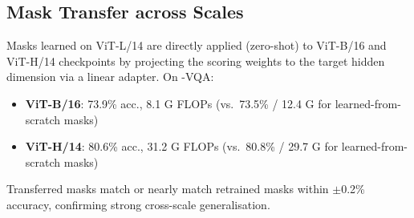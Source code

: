 \subsection{Mask Transfer across Scales}

\begin{tcolorbox}[contributionbox, title={Transfer Experiment}]
  \small
  Masks learned on ViT-L/14 are directly applied (zero-shot) to
  ViT-B/16 and ViT-H/14 checkpoints by projecting the scoring
  weights to the target hidden dimension via a linear adapter.
  On \dataset{}-VQA:
  \begin{itemize}[leftmargin=1em, itemsep=2pt, topsep=3pt]
    \item \textbf{ViT-B/16}: 73.9\% acc., 8.1 G FLOPs
          (vs.\ 73.5\% / 12.4 G for learned-from-scratch masks)
    \item \textbf{ViT-H/14}: 80.6\% acc., 31.2 G FLOPs
          (vs.\ 80.8\% / 29.7 G for learned-from-scratch masks)
  \end{itemize}
  Transferred masks match or nearly match retrained masks within
  \(\pm\)0.2\% accuracy, confirming strong cross-scale generalisation.
\end{tcolorbox}
